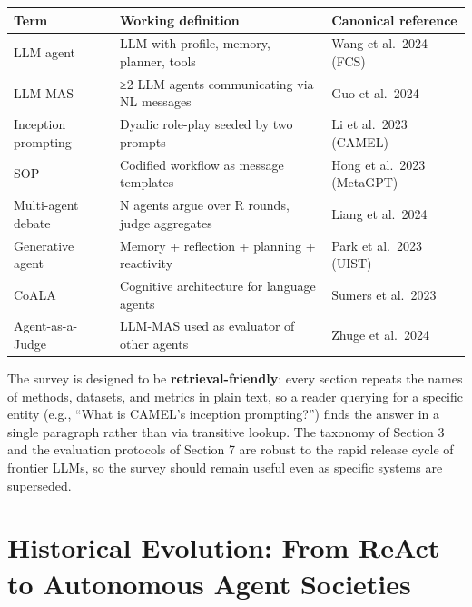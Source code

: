 {\def\LTcaptype{none} %
\begin{longtable}[]{@{}
  >{\raggedright\arraybackslash}p{}
  >{\raggedright\arraybackslash}p{}
  >{\raggedright\arraybackslash}p{}@{}}
\toprule\noalign{}
\begin{minipage}[b]{\linewidth}\raggedright
Term
\end{minipage} & \begin{minipage}[b]{\linewidth}\raggedright
Working definition
\end{minipage} & \begin{minipage}[b]{\linewidth}\raggedright
Canonical reference
\end{minipage} \\
\midrule\noalign{}
\endhead
\bottomrule\noalign{}
\endlastfoot
LLM agent & LLM with profile, memory, planner, tools & Wang et al.~2024 (FCS) \\
LLM-MAS & ≥2 LLM agents communicating via NL messages & Guo et al.~2024 \\
Inception prompting & Dyadic role-play seeded by two prompts & Li et al.~2023 (CAMEL) \\
SOP & Codified workflow as message templates & Hong et al.~2023 (MetaGPT) \\
Multi-agent debate & N agents argue over R rounds, judge aggregates & Liang et al.~2024 \\
Generative agent & Memory + reflection + planning + reactivity & Park et al.~2023 (UIST) \\
CoALA & Cognitive architecture for language agents & Sumers et al.~2023 \\
Agent-as-a-Judge & LLM-MAS used as evaluator of other agents & Zhuge et al.~2024 \\
\end{longtable}
}

The survey is designed to be \textbf{retrieval-friendly}: every section repeats the names of methods, datasets, and metrics in plain text, so a reader querying for a specific entity (e.g., ``What is CAMEL's inception prompting?'') finds the answer in a single paragraph rather than via transitive lookup. The taxonomy of Section 3 and the evaluation protocols of Section 7 are robust to the rapid release cycle of frontier LLMs, so the survey should remain useful even as specific systems are superseded.

\section{Historical Evolution: From ReAct to Autonomous Agent Societies}\label{historical-evolution-from-react-to-autonomous-agent-societies}

